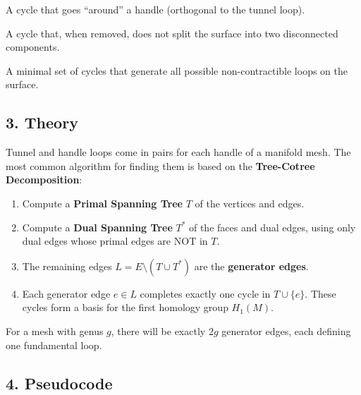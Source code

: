 \begin{definition}\label{def:handle_loop}
A cycle that goes ``around'' a handle (orthogonal to the tunnel loop).
\end{definition}

\begin{definition}\label{def:non_separating_cycle}
A cycle that, when removed, does not split the surface into two disconnected components.
\end{definition}

\begin{definition}\label{def:homology_basis}
A minimal set of cycles that generate all possible non-contractible loops on the surface.
\end{definition}

\subsection{3. Theory}

Tunnel and handle loops come in pairs for each handle of a manifold mesh. The most common algorithm for finding them is based on the \textbf{Tree-Cotree Decomposition}:
\begin{enumerate}
    \item Compute a \textbf{Primal Spanning Tree} $T$ of the vertices and edges.
    \item Compute a \textbf{Dual Spanning Tree} $T^*$ of the faces and dual edges, using only dual edges whose primal edges are NOT in $T$.
    \item The remaining edges $L = E \setminus (T \cup T^*)$ are the \textbf{generator edges}.
    \item Each generator edge $e \in L$ completes exactly one cycle in $T \cup \{e\}$. These cycles form a basis for the first homology group $H_1(M)$.
\end{enumerate}

For a mesh with genus $g$, there will be exactly $2g$ generator edges, each defining one fundamental loop.

\subsection{4. Pseudocode}

